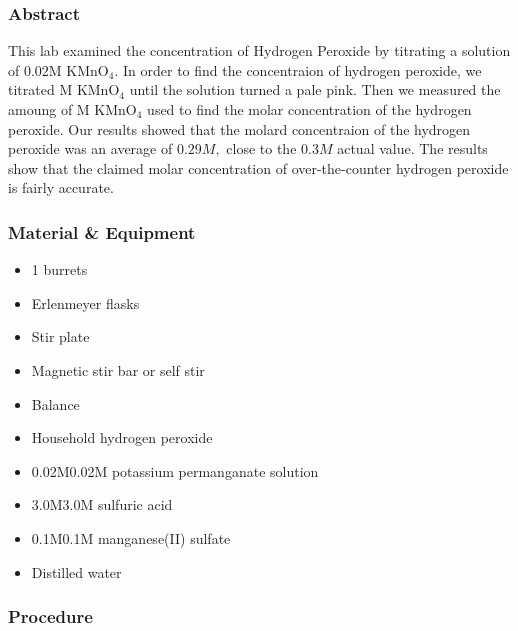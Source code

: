 \documentclass[
]{article}
\providecommand{\tightlist}{%
  \setlength{\itemsep}{0pt}\setlength{\parskip}{0pt}}
\begin{document}
\hypertarget{abstract}{%
\subsubsection{Abstract}\label{abstract}}

This lab examined the concentration of Hydrogen Peroxide by titrating a
solution of \(0.02 \text{M KMnO}_4.\) In order to find the concentraion
of hydrogen peroxide, we titrated \(\text{M KMnO}_4\) until the solution
turned a pale pink. Then we measured the amoung of \(\text{M KMnO}_4\)
used to find the molar concentration of the hydrogen peroxide. Our
results showed that the molard concentraion of the hydrogen peroxide was
an average of \(0.29M,\) close to the \(0.3M\) actual value. The results
show that the claimed molar concentration of over-the-counter hydrogen
peroxide is fairly accurate.

\hypertarget{material-equipment}{%
\subsubsection{Material \& Equipment}\label{material-equipment}}

\begin{itemize}
\tightlist
\item
  1 burrets
\item
  Erlenmeyer flasks
\item
  Stir plate
\item
  Magnetic stir bar or self stir
\item
  Balance
\item
  Household hydrogen peroxide
\item
  0.02M0.02M potassium permanganate solution
\item
  3.0M3.0M sulfuric acid
\item
  0.1M0.1M manganese(II) sulfate
\item
  Distilled water
\end{itemize}

\hypertarget{procedure}{%
\subsubsection{Procedure}\label{procedure}}
\end{document}
